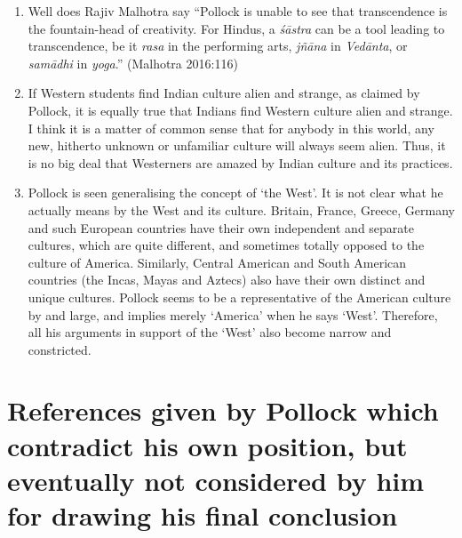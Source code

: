 \begin{enumerate}
\item Well does Rajiv Malhotra say ``Pollock is unable to see that transcendence is the fountain-head of creativity. For Hindus, a {\it śāstra} can be a tool leading to transcendence, be it {\it rasa} in the performing arts, {\it jñāna} in {\it Vedānta}, or {\it samādhi} in {\it yoga}.'' (Malhotra 2016:116)

\item If Western students find Indian culture alien and strange, as claimed by Pollock, it is equally true that Indians find Western culture alien and strange. I think it is a matter of common sense that for anybody in this world, any new, hitherto unknown or unfamiliar culture will always seem alien. Thus, it is no big deal that Westerners are amazed by Indian culture and its practices.

\item Pollock is seen generalising the concept of `the West'. It is not clear what he actually means by the West and its culture. Britain, France, Greece, Germany and such European countries have their own independent and separate cultures, which are quite different, and sometimes totally opposed to the culture of America. Similarly, Central American and South American countries (the Incas, Mayas and Aztecs) also have their own distinct and unique cultures. Pollock seems to be a representative of the American culture by and large, and implies merely `America' when he says `West'. Therefore, all his arguments in support of the `West' also become narrow and constricted. 
\end{enumerate}

\newpage

\section*{References given by Pollock which contradict his own position, but eventually not considered by him for drawing his final conclusion}

